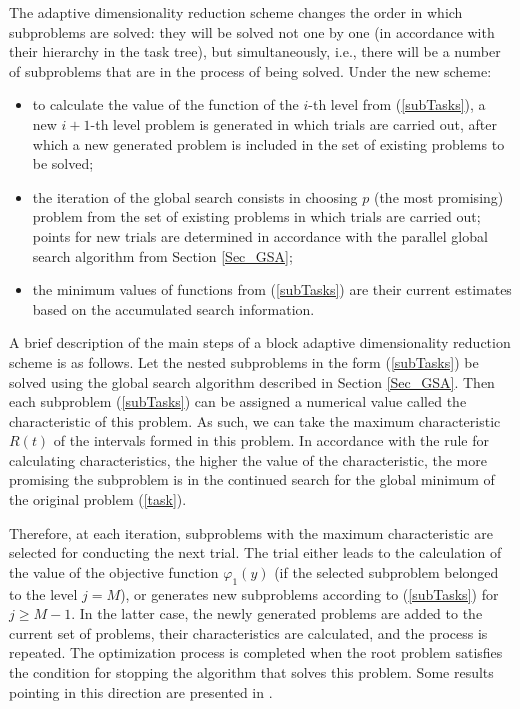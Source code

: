 \documentclass{svproc}
\begin{document}
The adaptive dimensionality reduction scheme changes the order in which subproblems are solved: they will be solved not one by one (in accordance with their hierarchy in the task tree), but simultaneously, i.e., there will be a number of subproblems that are in the process of being solved. Under the new scheme:	
	\begin{itemize}
		\item to calculate the value of the function of the \(i\)-th level from (\ref{subTasks}), a new \(i+1\)-th level problem is generated in which trials are carried out, after which a new generated problem is included in the set of existing problems to be solved;
		\item the iteration of the global search consists in choosing \(p\) (the most promising) problem from the set of existing problems in which trials are carried out; points for new trials are determined in accordance with the parallel global search algorithm from Section \ref{Sec_GSA};
		\item the minimum values of functions from (\ref{subTasks}) are their current estimates based on the accumulated search information.
	\end{itemize}
     
A brief description of the main steps of a block adaptive dimensionality reduction scheme is as follows.
Let the nested subproblems in the form (\ref{subTasks}) be solved using the global search algorithm described in Section \ref{Sec_GSA}. Then each subproblem (\ref{subTasks}) can be assigned a numerical value called the characteristic of this problem. As such, we can take the maximum characteristic \(R(t)\) of the intervals formed in this problem. In accordance with the rule for calculating characteristics, the higher the value of the characteristic, the more promising the subproblem is in the continued search for the global minimum of the original problem (\ref{task}). 

Therefore, at each iteration, subproblems with the maximum characteristic are selected for conducting the next trial. The trial either leads to the calculation of the value of the objective function \(\varphi_1(y)\) (if the selected subproblem belonged to the level \(j=M\)), or generates new subproblems according to (\ref{subTasks}) for \(j \geqslant  M-1\). In the latter case, the newly generated problems are added to the current set of problems, their characteristics are calculated, and the process is repeated. The optimization process is completed when the root problem satisfies the condition for stopping the algorithm that solves this problem. Some results pointing in this direction are presented in \cite{Barkalov2020}.
\end{document}
